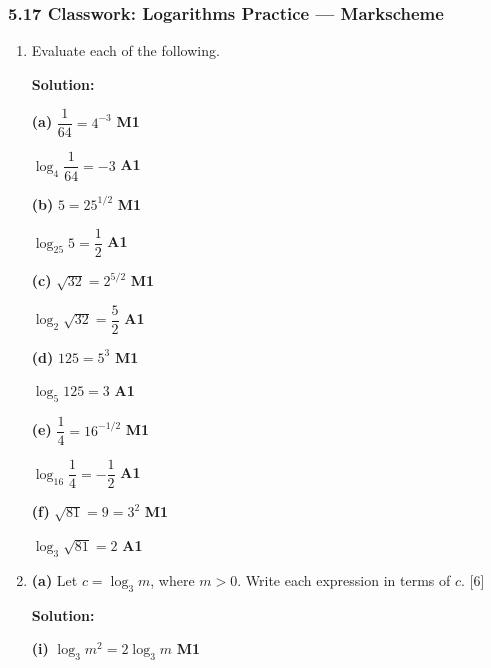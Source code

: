 \documentclass[12pt, twoside]{article}
\begin{document}
\subsubsection*{5.17 Classwork: Logarithms Practice --- Markscheme}

\begin{enumerate}[itemsep=0.3cm]

\item[1.] [Maximum mark: 12]

Evaluate each of the following.

\textbf{Solution:}

\textbf{(a)} $\dfrac{1}{64} = 4^{-3}$ \hfill \textbf{M1}

$\log_4 \dfrac{1}{64} = -3$ \hfill \textbf{A1}

\medskip

\textbf{(b)} $5 = 25^{1/2}$ \hfill \textbf{M1}

$\log_{25} 5 = \dfrac{1}{2}$ \hfill \textbf{A1}

\medskip

\textbf{(c)} $\sqrt{32} = 2^{5/2}$ \hfill \textbf{M1}

$\log_2 \sqrt{32} = \dfrac{5}{2}$ \hfill \textbf{A1}

\medskip

\textbf{(d)} $125 = 5^3$ \hfill \textbf{M1}

$\log_5 125 = 3$ \hfill \textbf{A1}

\medskip

\textbf{(e)} $\dfrac{1}{4} = 16^{-1/2}$ \hfill \textbf{M1}

$\log_{16} \dfrac{1}{4} = -\dfrac{1}{2}$ \hfill \textbf{A1}

\medskip

\textbf{(f)} $\sqrt{81} = 9 = 3^2$ \hfill \textbf{M1}

$\log_3 \sqrt{81} = 2$ \hfill \textbf{A1}

\newpage

\item[2.] [Maximum mark: 12]

\textbf{(a)} Let $c = \log_3 m$, where $m > 0$. Write each expression
in terms of $c$. \hfill [6]

\textbf{Solution:}

\textbf{(i)} $\log_3 m^2 = 2\log_3 m$ \hfill \textbf{M1}


\end{enumerate}
\end{document}
